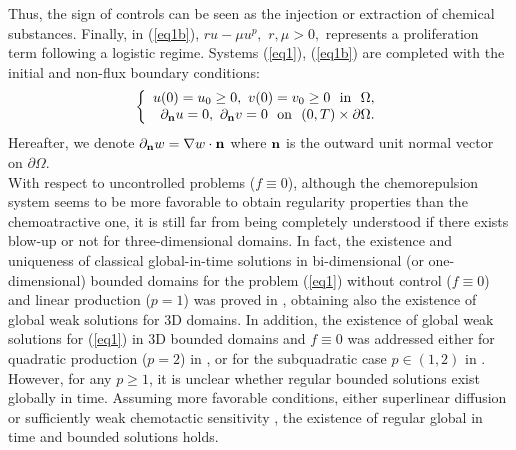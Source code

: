 \documentclass[11pt,reqno]{amsart}%
\numberwithin{equation}{section}
\begin{document}
 Thus, the sign of controls can be  seen as the injection or extraction of chemical substances. Finally, in (\ref{eq1b}), $ru-\mu u^p,$ $r,\mu>0,$  
represents a proliferation term following a logistic regime.
 Systems (\ref{eq1}), (\ref{eq1b}) are completed with the initial and non-flux boundary conditions:
 \begin{equation}\label{eq2}
\left\{
\begin{array}{rcl}
u(0)=u_0\ge0,\ v(0)=v_0\ge 0\ \mbox{ in }\ \Omega,\\
\partial_{\bf n} u=0,\ \partial_{\bf n} v=0\ \mbox{ on }\ (0,T)\times\partial\Omega.
\end{array}
\right.
\end{equation}
 Hereafter, we denote $\partial_{\bf n} w=\nabla w\cdot {\bf n}$ where ${\bf n}$ is the outward unit normal vector on $\partial\Omega$.\\

With respect to uncontrolled problems ($f \equiv 0$), although the chemorepulsion system seems to be more favorable to obtain regularity properties  than the chemoatractive  one, 
 it is still far from being completely understood if there exists blow-up or not for three-dimensional domains. In fact, 
 the existence and uniqueness of classical global-in-time solutions in bi-dimensional (or one-dimensional) bounded domains for the problem (\ref{eq1}) without control ($f \equiv 0$) and linear production ($p=1$) was proved in   \cite{cieslak}, obtaining also  
 the existence of global weak solutions for 3D  domains. In addition,
 the existence of global weak solutions for 
 (\ref{eq1}) in 3D bounded domains  and $f \equiv 0$ was addressed either  for quadratic production ($p=2$) in \cite{Diego1}, or for the subquadratic case $p\in(1,2)$ in \cite{Diego3}.
 However, for any $p\ge 1$,  it is unclear whether regular bounded solutions exist globally in time. Assuming more favorable conditions, either superlinear diffusion \cite{Freitag} or  sufficiently weak chemotactic sensitivity  \cite{tao}, 
  the existence of  regular global in time and bounded solutions holds.
 \\ 
\end{document}

